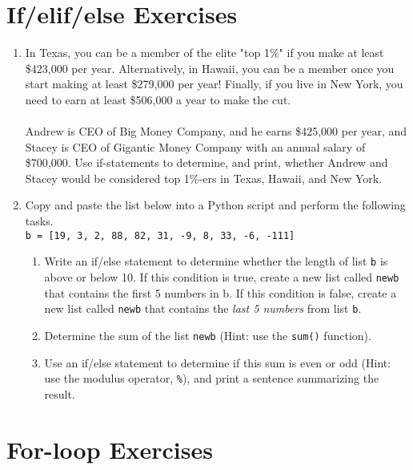 \documentclass{article}[12pt]
\newcommand{\code}[1]{\texttt{#1}}  %
\begin{document}
\vspace{2.25cm}

\section{If/elif/else Exercises}

\begin{enumerate}[itemsep=5ex]
	\item In Texas, you can be a member of the elite "top 1\%" if you make at least \$423,000 per year. Alternatively, in Hawaii, you can be a member once you start making at least \$279,000 per year! Finally, if you live in New York, you need to earn at least \$506,000 a year to make the cut. \\\\ Andrew is CEO of Big Money Company, and he earns \$425,000 per year, and Stacey is CEO of Gigantic Money Company with an annual salary of \$700,000. Use if-statements to determine, and print, whether Andrew and Stacey would be considered top 1\%-ers in Texas, Hawaii, and New York.
	
	\item Copy and paste the list below into a Python script and perform the following tasks. \\ \code{b = [19, 3, 2, 88, 82, 31, -9, 8, 33, -6, -111]} 
	\begin{enumerate}[itemsep=2ex]
		\item Write an if/else statement to determine whether the length of list \code{b} is above or below 10. If this condition is true, create a new list called \code{newb} that contains the first 5 numbers in b. If this condition is false, create a new list called \code{newb} that contains the \emph{last 5 numbers} from list \code{b}. 
		\item Determine the sum of the list \code{newb} (Hint: use the \code{sum()} function).
		\item Use an if/else statement to determine if this sum is even or odd (Hint: use the modulus operator, \code{\%}), and print a sentence summarizing the result.
	\end{enumerate}

	
		   
\end{enumerate}
			
\vspace{2.25cm}

\section{For-loop Exercises}
\end{document}
